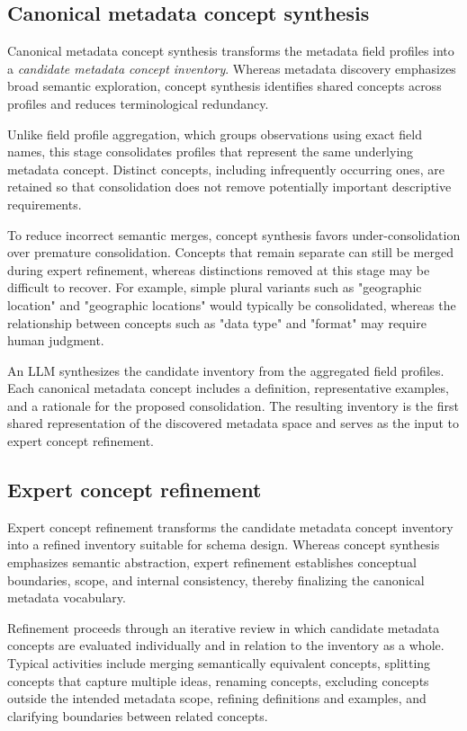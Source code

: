 \documentclass{article}
\begin{document}
\subsection{Canonical metadata concept synthesis}

Canonical metadata concept synthesis transforms the metadata field profiles into a \emph{candidate metadata concept inventory}. Whereas metadata discovery emphasizes broad semantic exploration, concept synthesis identifies shared concepts across profiles and reduces terminological redundancy.

Unlike field profile aggregation, which groups observations using exact field names, this stage consolidates profiles that represent the same underlying metadata concept. Distinct concepts, including infrequently occurring ones, are retained so that consolidation does not remove potentially important descriptive requirements.

To reduce incorrect semantic merges, concept synthesis favors under-consolidation over premature consolidation. Concepts that remain separate can still be merged during expert refinement, whereas distinctions removed at this stage may be difficult to recover. For example, simple plural variants such as "geographic location" and "geographic locations" would typically be consolidated, whereas the relationship between concepts such as "data type" and "format" may require human judgment.

An LLM synthesizes the candidate inventory from the aggregated field profiles. Each canonical metadata concept includes a definition, representative examples, and a rationale for the proposed consolidation. The resulting inventory is the first shared representation of the discovered metadata space and serves as the input to expert concept refinement.

\subsection{Expert concept refinement}

Expert concept refinement transforms the candidate metadata concept inventory into a refined inventory suitable for schema design. Whereas concept synthesis emphasizes semantic abstraction, expert refinement establishes conceptual boundaries, scope, and internal consistency, thereby finalizing the canonical metadata vocabulary.

Refinement proceeds through an iterative review in which candidate metadata concepts are evaluated individually and in relation to the inventory as a whole. Typical activities include merging semantically equivalent concepts, splitting concepts that capture multiple ideas, renaming concepts, excluding concepts outside the intended metadata scope, refining definitions and examples, and clarifying boundaries between related concepts.
\end{document}
